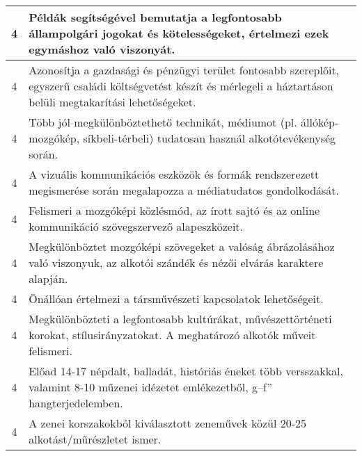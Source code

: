 \begin{longtable}{c | p{12cm} }
                                          4 &  Példák segítségével bemutatja a legfontosabb állampolgári jogokat és kötelességeket, értelmezi ezek egymáshoz való viszonyát. \\ \hline
                                          4 &  Azonosítja a gazdasági és pénzügyi terület fontosabb szereplőit, egyszerű családi költségvetést készít és mérlegeli a háztartáson belüli megtakarítási lehetőségeket. \\ \hline
                                          4 &  Több jól megkülönböztethető technikát, médiumot (pl. állókép-mozgókép, síkbeli-térbeli) tudatosan használ alkotótevékenység során. \\ \hline
                                          4 &  A vizuális kommunikációs eszközök és formák rendszerezett megismerése során megalapozza a médiatudatos gondolkodását. \\ \hline
                                          4 &  Felismeri a mozgóképi közlésmód, az írott sajtó és az online kommunikáció szövegszervező alapeszközeit. \\ \hline
                                          4 &  Megkülönböztet mozgóképi szövegeket a valóság ábrázolásához való viszonyuk, az alkotói szándék és nézői elvárás karaktere alapján. \\ \hline
                                          4 &  Önállóan értelmezi a társművészeti kapcsolatok lehetőségeit. \\ \hline
                                          4 &  Megkülönbözteti a legfontosabb kultúrákat, művészettörténeti korokat, stílusirányzatokat. A meghatározó alkotók műveit felismeri. \\ \hline
                                          4 &  Előad 14-17 népdalt, balladát, históriás éneket több versszakkal, valamint 8-10 műzenei idézetet emlékezetből, g–f” hangterjedelemben. \\ \hline
                                          4 &  A zenei korszakokból kiválasztott zeneművek közül 20-25 alkotást/műrészletet ismer. \\ \hline
                                      
                        \end{longtable}
            \clearpage

